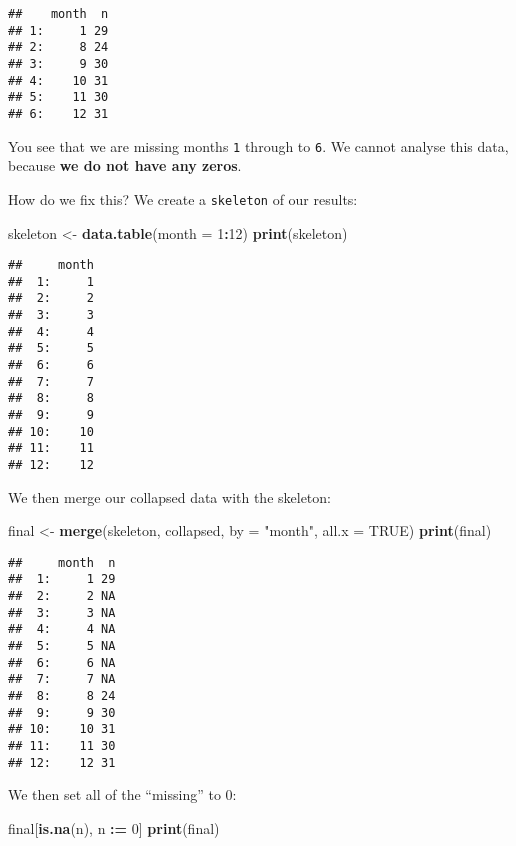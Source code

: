 \documentclass[]{book}
\newenvironment{Shaded}{\begin{snugshade}}{\end{snugshade}}
\newcommand{\KeywordTok}[1]{\textcolor[rgb]{0.13,0.29,0.53}{\textbf{#1}}}
\newcommand{\DataTypeTok}[1]{\textcolor[rgb]{0.13,0.29,0.53}{#1}}
\newcommand{\DecValTok}[1]{\textcolor[rgb]{0.00,0.00,0.81}{#1}}
\newcommand{\StringTok}[1]{\textcolor[rgb]{0.31,0.60,0.02}{#1}}
\newcommand{\OtherTok}[1]{\textcolor[rgb]{0.56,0.35,0.01}{#1}}
\newcommand{\OperatorTok}[1]{\textcolor[rgb]{0.81,0.36,0.00}{\textbf{#1}}}
\newcommand{\ErrorTok}[1]{\textcolor[rgb]{0.64,0.00,0.00}{\textbf{#1}}}
\newcommand{\NormalTok}[1]{#1}
\begin{document}
\begin{verbatim}
##    month  n
## 1:     1 29
## 2:     8 24
## 3:     9 30
## 4:    10 31
## 5:    11 30
## 6:    12 31
\end{verbatim}

You see that we are missing months \texttt{1} through to \texttt{6}. We
cannot analyse this data, because \textbf{we do not have any zeros}.

How do we fix this? We create a \texttt{skeleton} of our results:

\begin{Shaded}
\begin{Highlighting}[]
\NormalTok{skeleton <-}\StringTok{ }\KeywordTok{data.table}\NormalTok{(}\DataTypeTok{month =} \DecValTok{1}\OperatorTok{:}\DecValTok{12}\NormalTok{)}
\KeywordTok{print}\NormalTok{(skeleton)}
\end{Highlighting}
\end{Shaded}

\begin{verbatim}
##     month
##  1:     1
##  2:     2
##  3:     3
##  4:     4
##  5:     5
##  6:     6
##  7:     7
##  8:     8
##  9:     9
## 10:    10
## 11:    11
## 12:    12
\end{verbatim}

We then merge our collapsed data with the skeleton:

\begin{Shaded}
\begin{Highlighting}[]
\NormalTok{final <-}\StringTok{ }\KeywordTok{merge}\NormalTok{(skeleton, collapsed, }\DataTypeTok{by =} \StringTok{"month"}\NormalTok{, }\DataTypeTok{all.x =} \OtherTok{TRUE}\NormalTok{)}
\KeywordTok{print}\NormalTok{(final)}
\end{Highlighting}
\end{Shaded}

\begin{verbatim}
##     month  n
##  1:     1 29
##  2:     2 NA
##  3:     3 NA
##  4:     4 NA
##  5:     5 NA
##  6:     6 NA
##  7:     7 NA
##  8:     8 24
##  9:     9 30
## 10:    10 31
## 11:    11 30
## 12:    12 31
\end{verbatim}

We then set all of the ``missing'' to 0:

\begin{Shaded}
\begin{Highlighting}[]
\NormalTok{final[}\KeywordTok{is.na}\NormalTok{(n), n }\OperatorTok{:}\ErrorTok{=}\StringTok{ }\DecValTok{0}\NormalTok{]}
\KeywordTok{print}\NormalTok{(final)}
\end{Highlighting}
\end{Shaded}
\end{document}

